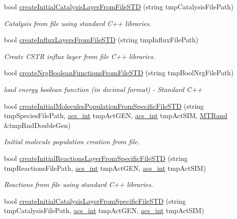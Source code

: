 \begin{DoxyCompactItemize}
bool \hyperlink{a00003_a29eeb7a1b4689c10fd872e82179b4d84}{create\-Initial\-Catalysis\-Layer\-From\-File\-S\-T\-D} (string tmp\-Catalysis\-File\-Path)
\begin{DoxyCompactList}\small\item\em Catalysis from file using standard C++ libraries. \end{DoxyCompactList}\item 
bool \hyperlink{a00003_a902df40829dad9a885122082ec8fff7a}{create\-Influx\-Layers\-From\-File\-S\-T\-D} (string tmp\-Influx\-File\-Path)
\begin{DoxyCompactList}\small\item\em Create C\-S\-T\-R influx layer from file C++ libraries. \end{DoxyCompactList}\item 
bool \hyperlink{a00003_abe1a616460ea328067874df715679319}{create\-Nrg\-Boolean\-Functions\-From\-File\-S\-T\-D} (string tmp\-Bool\-Nrg\-File\-Path)
\begin{DoxyCompactList}\small\item\em load energy boolean function (in decimal format) -\/ Standard C++ \end{DoxyCompactList}\item 
bool \hyperlink{a00003_ab85fdf18a88fb51afc48eba31d0ed1b2}{create\-Initial\-Molecules\-Population\-From\-Specific\-File\-S\-T\-D} (string tmp\-Species\-File\-Path, \hyperlink{a00016_a8d277355641a098190360234e2ebde35}{acs\-\_\-int} tmp\-Act\-G\-E\-N, \hyperlink{a00016_a8d277355641a098190360234e2ebde35}{acs\-\_\-int} tmp\-Act\-S\-I\-M, \hyperlink{a00008}{M\-T\-Rand} \&tmp\-Rnd\-Double\-Gen)
\begin{DoxyCompactList}\small\item\em Initial molecule population creation from file. \end{DoxyCompactList}\item 
bool \hyperlink{a00003_a743956229b11d7860dbc89a18f869586}{create\-Initial\-Reactions\-Layer\-From\-Specific\-File\-S\-T\-D} (string tmp\-Reactions\-File\-Path, \hyperlink{a00016_a8d277355641a098190360234e2ebde35}{acs\-\_\-int} tmp\-Act\-G\-E\-N, \hyperlink{a00016_a8d277355641a098190360234e2ebde35}{acs\-\_\-int} tmp\-Act\-S\-I\-M)
\begin{DoxyCompactList}\small\item\em Reactions from file using standard C++ libraries. \end{DoxyCompactList}\item 
bool \hyperlink{a00003_a6dd31bae82367ebe7d6a6bb062b8cd07}{create\-Initial\-Catalysis\-Layer\-From\-Specific\-File\-S\-T\-D} (string tmp\-Catalysis\-File\-Path, \hyperlink{a00016_a8d277355641a098190360234e2ebde35}{acs\-\_\-int} tmp\-Act\-G\-E\-N, \hyperlink{a00016_a8d277355641a098190360234e2ebde35}{acs\-\_\-int} tmp\-Act\-S\-I\-M)

\end{DoxyCompactItemize}
